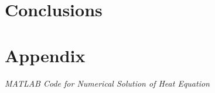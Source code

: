 \documentclass[10pt, letter, showtrims]{extarticle}
\begin{document}
		\pagebreak
		
		\section{Conclusions}
		
		\pagebreak	
	
	\section{Appendix}
	
	\centerline{\textit{MATLAB Code for Numerical Solution of Heat Equation}}
	
	
	
	\pagebreak
	
	
	
\end{document}

